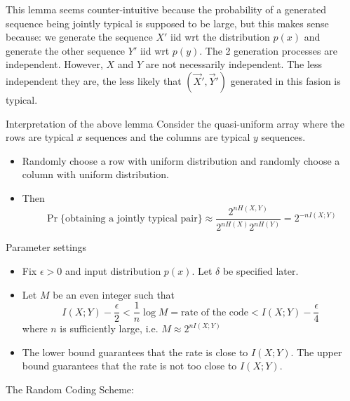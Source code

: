 \documentclass[../main.tex]{subfiles}
\begin{document}
This lemma seems counter-intuitive because the probability of a generated sequence being jointly typical is supposed to be large, but this makes sense because: we generate the sequence $X'$ iid wrt the distribution $p(x)$ and generate the other sequence $Y'$ iid wrt $p(y)$. The 2 generation processes are independent. However, $X$ and $Y$ are not necessarily independent. The less independent they are, the less likely that $(\vec X', \vec Y')$ generated in this fasion is typical.
\begin{pbox}{Interpretation of the above lemma}
    Consider the quasi-uniform array where the rows are typical $x$ sequences and the columns are typical $y$ sequences.
    \begin{itemize}
        \item Randomly choose a row with uniform distribution and randomly choose a column with uniform distribution.
        \item Then \[
        \Pr\{\text{obtaining a jointly typical pair}\} \approx \frac{2^{nH(X,Y)}}{2^{nH(X)}2^{nH(Y)}} = 2^{-nI(X;Y)}
        \]
    \end{itemize}
\end{pbox}
Parameter settings \begin{itemize}
    \item Fix $\epsilon>0$ and input distribution $p(x)$. Let $\delta$ be specified later.
    \item Let $M$ be an even integer such that \[
    I(X;Y)-\frac{\epsilon}{2}<\frac{1}{n}\log M = \text{rate of the code} < I(X;Y)-\frac{\epsilon}{4}
    \] where $n$ is sufficiently large, i.e. $M\approx 2^{nI(X;Y)}$
    \item The lower bound guarantees that the rate is close to $I(X;Y)$. The upper bound guarantees that the rate is not too close to $I(X;Y)$.
\end{itemize}
The Random Coding Scheme:
\end{document}

